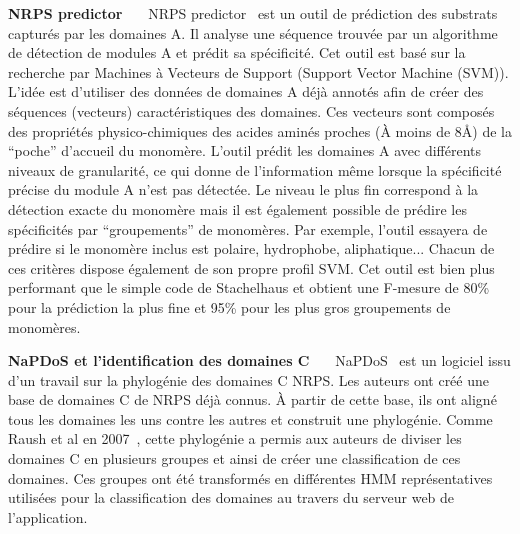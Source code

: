 \textbf{NRPS predictor}~~~
NRPS predictor~\cite{rottig_nrpspredictor2web_2011,rausch_specificity_2005} est un outil de prédiction des substrats capturés par les domaines A.
Il analyse une séquence trouvée par un algorithme de détection de modules A et prédit sa spécificité.
Cet outil est basé sur la recherche par Machines à Vecteurs de Support (Support Vector Machine (SVM)).
L'idée est d'utiliser des données de domaines A déjà annotés afin de créer des séquences (vecteurs) caractéristiques des domaines.
Ces vecteurs sont composés des propriétés physico-chimiques des acides aminés proches (À moins de 8Å) de la ``poche'' d'accueil du monomère.
L'outil prédit les domaines A avec différents niveaux de granularité, ce qui donne de l'information même lorsque la spécificité précise du module A n'est pas détectée.
Le niveau le plus fin correspond à la détection exacte du monomère mais il est également possible de prédire les spécificités par ``groupements'' de monomères.
Par exemple, l'outil essayera de prédire si le monomère inclus est polaire, hydrophobe, aliphatique...
Chacun de ces critères dispose également de son propre profil SVM.
Cet outil est bien plus performant que le simple code de Stachelhaus et obtient une F-mesure de 80\% pour la prédiction la plus fine et 95\% pour les plus gros groupements de monomères.


\textbf{NaPDoS et l'identification des domaines C}~~~
NaPDoS~\cite{ziemert_natural_2012} est un logiciel issu d'un travail sur la phylogénie des domaines C NRPS.
Les auteurs ont créé une base de domaines C de NRPS déjà connus.
À partir de cette base, ils ont aligné tous les domaines les uns contre les autres et construit une phylogénie.
Comme Raush et al en 2007~\cite{rausch_phylogenetic_2007}, cette phylogénie a permis aux auteurs de diviser les domaines C en plusieurs groupes et ainsi de créer une classification de ces domaines.
Ces groupes ont été transformés en différentes HMM représentatives utilisées pour la classification des domaines au travers du serveur web de l'application.


